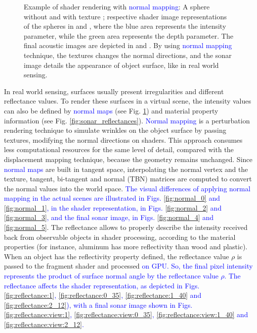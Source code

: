 \documentclass[final,5p,times]{elsarticle}
\begin{document}
\begin{figure}[!ht]
{        \label{fig:normal_5}
    }
    \captionsetup{justification=justified}
    \caption{Example of shader rendering with \textcolor{blue}{normal mapping}:
    A sphere without  and with texture
    ; respective shader image representations of the spheres
    in  and , where the blue area represents the
    intensity parameter, while the green area represents the depth parameter. The final acoustic
    images are depicted in  and . By using
    \textcolor{blue}{normal mapping} technique, the textures changes the normal directions,
    and the sonar image details the appearance of object surface, like
    in real world sensing.}
    \label{fig:sonar_normal_mapping}
\end{figure}

In real world sensing, surfaces usually present irregularities
and different reflectance values. To render these surfaces in a virtual scene, the intensity values can also be defined by \textcolor{blue}{normal maps} (see Fig. \ref{fig:sonar_normal_mapping}) and material property information (see Fig. \ref{fig:sonar_reflectances}). \textcolor{blue}{Normal mapping} is a perturbation rendering technique to simulate wrinkles on the object surface by passing textures, modifying the normal directions on shaders. This approach consumes less computational
resources for the same level of detail, compared with the displacement mapping
technique, because the geometry remains unchanged. Since \textcolor{blue}{normal maps} are built in tangent space, interpolating the normal vertex and the texture, tangent, bi-tangent and normal (TBN) matrices are computed to convert the normal values into the world space. \textcolor{blue}{The visual differences of applying normal mapping in the actual scenes are illustrated in Figs. \ref{fig:normal_0} and \ref{fig:normal_1}, in the shader representation, in Figs. \ref{fig:normal_2} and \ref{fig:normal_3}, and the final sonar image, in Figs. \ref{fig:normal_4} and \ref{fig:normal_5}}. The reflectance allows to properly describe the intensity received back from observable objects in shader processing, according to the material
properties (for instance, aluminum has more reflectivity than wood and plastic).
When an object has the reflectivity property defined, the reflectance value
$\rho$ is passed to the fragment shader and processed \textcolor{blue}{on GPU. So, the final pixel intensity represents the product of surface normal angle by the reflectance value $\rho$. The reflectance affects the shader representation, as depicted in Figs. \ref{fig:reflectance:1}, \ref{fig:reflectance:0_35}, \ref{fig:reflectance:1_40} and \ref{fig:reflectance:2_12}), with a final sonar image shown in Figs. \ref{fig:reflectance:view:1}, \ref{fig:reflectance:view:0_35}, \ref{fig:reflectance:view:1_40} and \ref{fig:reflectance:view:2_12}.}
\end{document}
